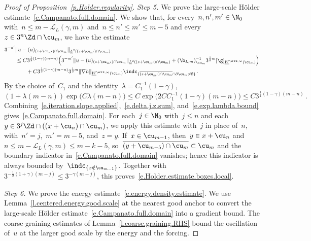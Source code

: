 \documentclass[11pt]{amsart}
\begin{document}
\begin{proof}[{Proof of Proposition~\ref{p.Holder.regularity}}]
\emph{Step 5.} We prove the large-scale H\"older estimate~\eqref{e.Campanato.full.domain}. We show that, for every~$n,n',m'\in\N_0$ with~$n\leq m-\mathcal L_L(\gamma,m)$ and~$n\leq n'\leq m'\leq m-5$ and every~$z\in 3^n\Zd\cap\cu_m$, we have the estimate
\begin{align}
	\lefteqn{3^{-n'}\|u-(u)_{(z+\cu_{n'})\cap\cu_m}\|_{\underline{L}^2((z+\cu_{n'})\cap\cu_m)}} \qquad &
	\notag \\ &
	\leq C3^{\frac{1}{2}(1-\gamma)(m-n)}
	\Bigl(3^{-m'}\|u-(u)_{(z+\cu_{m'})\cap\cu_m}\|_{\underline{L}^2((z+\cu_{m'})\cap\cu_m)}
	+ (\b_{L,m})_{\cu_m}^{-1} 3^{\frac{1}{2} m}[\g]_{\underline{W}^{\nf12,\infty}(\cu_m)}\Bigr)
	\notag \\ & \qquad
	+ C3^{\frac{1}{2}(1-\gamma)(m-n)} 3^{\frac{1}{2} m}\|\nabla h\|_{\underline{W}^{\nf12,\infty}(\cu_m)}
	\indc_{\{\overline{(z+\cu_{m'})\cap\cu_m}\cap\partial\cu_m\neq\emptyset\}}
	\,.
	\label{e.Campanato.full.domain}
\end{align}
By the choice of~$C_1$ and the identity~$\lambda=C_1^{-1}(1-\gamma)$,
\begin{equation}
	(1+\lambda(m-n))\exp\bigl(C\lambda(m-n)\bigr)
	\leq C\exp\bigl(2CC_1^{-1}(1-\gamma)(m-n)\bigr)
	\leq C3^{\frac{1}{4}(1-\gamma)(m-n)}\,.
	\label{e.exp.lambda.bound}
\end{equation}
Combining~\eqref{e.iteration.slope.applied},~\eqref{e.delta.j.z.sum}, and~\eqref{e.exp.lambda.bound} gives~\eqref{e.Campanato.full.domain}. For each~$j\in\N_0$ with~$j\leq n$ and each~$y\in3^j\Zd\cap((x+\cu_n)\cap\cu_m)$, we apply this estimate with~$j$ in place of~$n$, with~$n'=j$,~$m'=m-5$, and~$z=y$. If~$x\in\cu_{m-1}$, then~$y\in x+\cu_n$ and~$n\leq m-\mathcal L_L(\gamma,m)\leq m-k-5$, so~$\overline{(y+\cu_{m-5})\cap\cu_m}\subset\cu_m$ and the boundary indicator in~\eqref{e.Campanato.full.domain} vanishes; hence this indicator is always bounded by~$\indc_{\{x\notin\cu_{m-1}\}}$. Together with~$3^{-\frac{1}{2}(1+\gamma)(m-j)}\leq 3^{-\gamma(m-j)}$, this proves~\eqref{e.Holder.estimate.boxes.local}.

\smallskip

\emph{Step 6.} We prove the energy estimate~\eqref{e.energy.density.estimate}. We use Lemma~\ref{l.centered.energy.good.scale} at the nearest good anchor to convert the large-scale H\"older estimate~\eqref{e.Campanato.full.domain} into a gradient bound. The coarse-graining estimates of Lemma~\ref{l.coarse.graining.RHS} bound the oscillation of~$u$ at the larger good scale by the energy and the forcing.


\end{proof}
\end{document}
